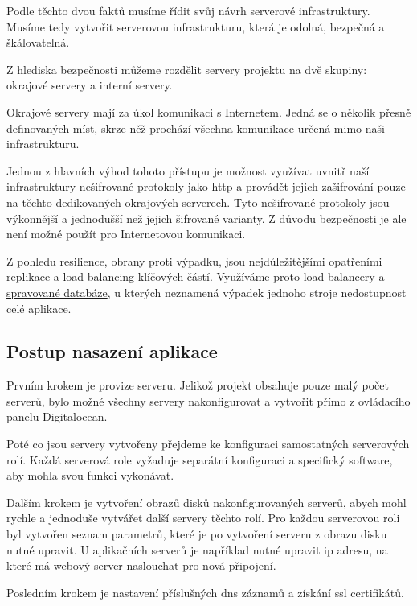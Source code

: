 \emptyLine

Podle těchto dvou faktů musíme řídit svůj návrh serverové infrastruktury.  Musíme tedy vytvořit serverovou infrastrukturu, která je odolná, bezpečná a škálovatelná.

Z hlediska bezpečnosti můžeme rozdělit servery projektu \bso na dvě skupiny: okrajové servery a interní servery.

Okrajové servery mají za úkol komunikaci s Internetem. Jedná se o několik přesně definovaných míst, skrze něž prochází všechna komunikace určená mimo naši infrastrukturu.

Jednou z hlavních výhod tohoto přístupu je možnost využívat uvnitř naší infrastruktury nešifrované protokoly jako \acrshort{http} a provádět jejich zašifrování pouze na těchto dedikovaných okrajových serverech. Tyto nešifrované protokoly jsou výkonnější a jednodušší než jejich šifrované varianty\cite{http-faster-https}. Z důvodu bezpečnosti je ale není možné použít pro Internetovou komunikaci.

Z pohledu resilience, obrany proti výpadku, jsou nejdůležitějšími opatřeními replikace a \hyperref[sub:load-balancing]{load-balancing} klíčových částí. Využíváme proto \hyperref[sub:load-balancing]{load balancery} a \hyperref[subsub:managed-databases]{spravované databáze}, u kterých neznamená výpadek jednoho stroje nedostupnost celé aplikace.


\subsection{Postup nasazení aplikace}
\label{sub:deployment}

Prvním krokem je provize serveru. Jelikož projekt \bso obsahuje pouze malý počet serverů, bylo možné všechny servery nakonfigurovat a vytvořit přímo z ovládacího panelu Digitalocean.

Poté co jsou servery vytvořeny přejdeme ke konfiguraci samostatných serverových rolí. Každá serverová role vyžaduje separátní konfiguraci a specifický software, aby mohla svou funkci vykonávat.

Dalším krokem je vytvoření obrazů disků nakonfigurovaných serverů, abych mohl rychle a jednoduše vytvářet další servery těchto rolí. Pro každou serverovou roli byl vytvořen seznam parametrů, které je po vytvoření serveru z obrazu disku nutné upravit. U aplikačních serverů je například nutné upravit \acrshort{ip} adresu, na které má webový server naslouchat pro nová připojení. 

Posledním krokem je nastavení příslušných \acrshort{dns} záznamů a získání \acrshort{ssl} certifikátů.

